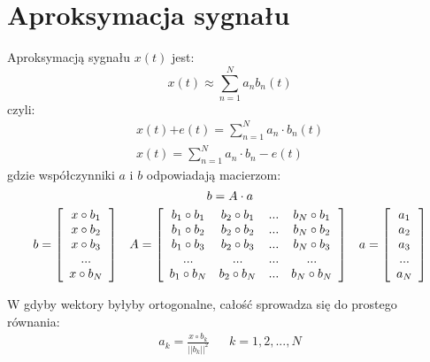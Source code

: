 \section{Aproksymacja sygnału}
    Aproksymacją sygnału $x(t)$ jest:
    \begin{equation*}
        x(t) \approx \sum_{n=1}^{N}a_nb_n(t)
    \end{equation*}
    czyli:
    \begin{align*}
        x(t)  \textbf{+}e(t) = \sum_{n=1}^{N}a_n\cdot b_n(t)\\
        x(t) = \sum_{n=1}^{N}a_n\cdot b_n-e(t)
    \end{align*}
    gdzie współczynniki $a$ i $b$ odpowiadają macierzom:
    \begin{equation*}
        b = A \cdot a\\
    \end{equation*}
    \begin{align*}
        b = \left[\begin{array}{c}
            x\circ b_1\\
            x\circ b_2\\
            x\circ b_3\\
            ...\\
            x\circ b_N
        \end{array}\right] &&
        A = \left[\begin{array}{c c c c}
            b_1\circ b_1 & b_2\circ b_1 & ... & b_N\circ b_1\\
            b_1\circ b_2 & b_2\circ b_2 & ... & b_N\circ b_2\\
            b_1\circ b_3 & b_2\circ b_3 & ... & b_N\circ b_3\\
            ...          & ...          & ... & ...\\
            b_1\circ b_N & b_2\circ b_N & ... & b_N\circ b_N
        \end{array}\right] &&
        a = \left[\begin{array}{c}
            a_1\\
            a_2\\
            a_3\\
            ...\\
            a_N
        \end{array}\right]
    \end{align*}

    W gdyby wektory byłyby ortogonalne, całość sprowadza się do prostego równania:
    \begin{align*}
        a_k = \frac{x\circ b_k}{||b_k||^2} && k = 1, 2, ..., N
    \end{align*}

